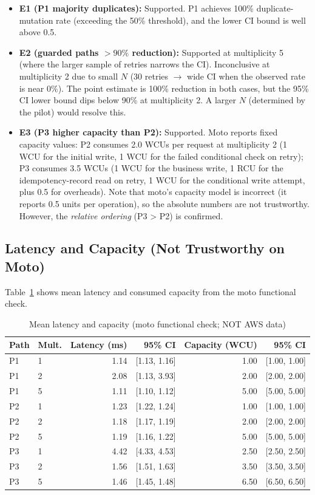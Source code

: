 \begin{itemize}
    \item \textbf{E1 (P1 majority duplicates):} Supported. P1 achieves 100\% duplicate-mutation rate (exceeding the 50\% threshold), and the lower CI bound is well above 0.5.
    \item \textbf{E2 (guarded paths $> 90\%$ reduction):} Supported at multiplicity 5 (where the larger sample of retries narrows the CI). Inconclusive at multiplicity 2 due to small $N$ (30 retries $\rightarrow$ wide CI when the observed rate is near 0\%). The point estimate is 100\% reduction in both cases, but the 95\% CI lower bound dips below 90\% at multiplicity 2. A larger $N$ (determined by the pilot) would resolve this.
    \item \textbf{E3 (P3 higher capacity than P2):} Supported. Moto reports fixed capacity values: P2 consumes 2.0 WCUs per request at multiplicity 2 (1 WCU for the initial write, 1 WCU for the failed conditional check on retry); P3 consumes 3.5 WCUs (1 WCU for the business write, 1 RCU for the idempotency-record read on retry, 1 WCU for the conditional write attempt, plus 0.5 for overheads). Note that moto's capacity model is incorrect (it reports 0.5 units per operation), so the absolute numbers are not trustworthy. However, the \textit{relative ordering} (P3 > P2) is confirmed.
\end{itemize}

\subsection{Latency and Capacity (Not Trustworthy on Moto)}

Table~\ref{tab:eval_latency_capacity} shows mean latency and consumed capacity from the moto functional check.

\begin{table}[h]
\centering
\caption{Mean latency and capacity (moto functional check; NOT AWS data)}
\label{tab:eval_latency_capacity}
\begin{tabular}{llrrrr}
\hline
\textbf{Path} & \textbf{Mult.} & \textbf{Latency (ms)} & \textbf{95\% CI} & \textbf{Capacity (WCU)} & \textbf{95\% CI} \\
\hline
P1 & 1 & 1.14 & [1.13, 1.16] & 1.00 & [1.00, 1.00] \\
P1 & 2 & 2.08 & [1.13, 3.93] & 2.00 & [2.00, 2.00] \\
P1 & 5 & 1.11 & [1.10, 1.12] & 5.00 & [5.00, 5.00] \\
\hline
P2 & 1 & 1.23 & [1.22, 1.24] & 1.00 & [1.00, 1.00] \\
P2 & 2 & 1.18 & [1.17, 1.19] & 2.00 & [2.00, 2.00] \\
P2 & 5 & 1.19 & [1.16, 1.22] & 5.00 & [5.00, 5.00] \\
\hline
P3 & 1 & 4.42 & [4.33, 4.53] & 2.50 & [2.50, 2.50] \\
P3 & 2 & 1.56 & [1.51, 1.63] & 3.50 & [3.50, 3.50] \\
P3 & 5 & 1.46 & [1.45, 1.48] & 6.50 & [6.50, 6.50] \\
\hline
\end{tabular}
\end{table}

